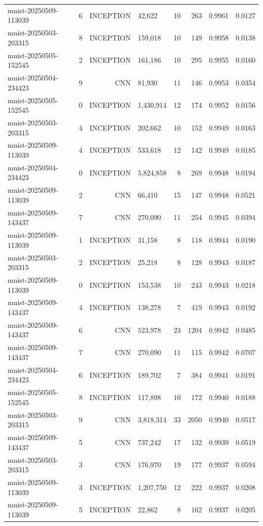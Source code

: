 \begin{tabular}{llrlrrrr}
mnist-20250509-113039 & 6 & INCEPTION & 42,622 & 10 & 263 & 0.9961 & 0.0127 \\
mnist-20250503-203315 & 8 & INCEPTION & 159,018 & 10 & 149 & 0.9958 & 0.0138 \\
mnist-20250505-152545 & 2 & INCEPTION & 161,186 & 10 & 295 & 0.9955 & 0.0160 \\
mnist-20250504-234423 & 9 & CNN & 81,930 & 11 & 146 & 0.9953 & 0.0354 \\
mnist-20250505-152545 & 0 & INCEPTION & 1,430,914 & 12 & 174 & 0.9952 & 0.0156 \\
mnist-20250503-203315 & 4 & INCEPTION & 202,662 & 10 & 152 & 0.9949 & 0.0163 \\
mnist-20250509-113039 & 4 & INCEPTION & 533,618 & 12 & 142 & 0.9949 & 0.0185 \\
mnist-20250504-234423 & 0 & INCEPTION & 5,824,858 & 8 & 269 & 0.9948 & 0.0194 \\
mnist-20250509-113039 & 2 & CNN & 66,410 & 15 & 147 & 0.9948 & 0.0521 \\
mnist-20250509-143437 & 7 & CNN & 270,090 & 11 & 254 & 0.9945 & 0.0394 \\
mnist-20250509-113039 & 1 & INCEPTION & 31,158 & 8 & 118 & 0.9944 & 0.0190 \\
mnist-20250503-203315 & 2 & INCEPTION & 25,218 & 8 & 128 & 0.9943 & 0.0187 \\
mnist-20250509-113039 & 0 & INCEPTION & 153,538 & 10 & 243 & 0.9943 & 0.0218 \\
mnist-20250509-143437 & 4 & INCEPTION & 138,278 & 7 & 419 & 0.9943 & 0.0192 \\
mnist-20250509-143437 & 6 & CNN & 523,978 & 23 & 1204 & 0.9942 & 0.0485 \\
mnist-20250509-143437 & 7 & CNN & 270,090 & 11 & 115 & 0.9942 & 0.0707 \\
mnist-20250504-234423 & 6 & INCEPTION & 189,702 & 7 & 384 & 0.9941 & 0.0191 \\
mnist-20250505-152545 & 8 & INCEPTION & 117,898 & 10 & 172 & 0.9940 & 0.0188 \\
mnist-20250503-203315 & 9 & CNN & 3,818,314 & 33 & 2050 & 0.9940 & 0.0517 \\
mnist-20250509-143437 & 5 & CNN & 737,242 & 17 & 132 & 0.9939 & 0.0519 \\
mnist-20250503-203315 & 3 & CNN & 176,970 & 19 & 177 & 0.9937 & 0.0594 \\
mnist-20250509-113039 & 3 & INCEPTION & 1,207,750 & 12 & 222 & 0.9937 & 0.0208 \\
mnist-20250509-113039 & 5 & INCEPTION & 22,862 & 8 & 162 & 0.9937 & 0.0205 \\

\end{tabular}
